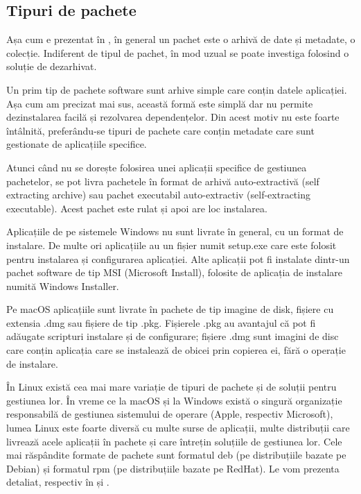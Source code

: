 \subsection{Tipuri de pachete}
\label{sec:package:types}

Așa cum e prezentat în , în general un pachet este o arhivă de date și metadate, o colecție. Indiferent de tipul de pachet, în mod uzual se poate investiga folosind o soluție de dezarhivat.

Un prim tip de pachete software sunt arhive simple care conțin datele aplicației. Așa cum am precizat mai sus, această formă este simplă dar nu permite dezinstalarea facilă și rezolvarea dependențelor. Din acest motiv nu este foarte întâlnită, preferându-se tipuri de pachete care conțin metadate care sunt gestionate de aplicațiile specifice.

Atunci când nu se dorește folosirea unei aplicații specifice de gestiunea pachetelor, se pot livra pachetele în format de arhivă auto-extractivă (self extracting archive) sau pachet executabil auto-extractiv (self-extracting executable). Acest pachet este rulat și apoi are loc instalarea.

Aplicațiile de pe sistemele Windows nu sunt livrate în general, cu un format de instalare. De multe ori aplicațiile au un fișier numit setup.exe care este folosit pentru instalarea și configurarea aplicației. Alte aplicații pot fi instalate dintr-un pachet software de tip MSI (Microsoft Install), folosite de aplicația de instalare numită Windows Installer.

Pe macOS aplicațiile sunt livrate în pachete de tip imagine de disk, fișiere cu extensia .dmg sau fișiere de tip .pkg. Fișierele .pkg au avantajul că pot fi adăugate scripturi instalare și de configurare; fișiere .dmg sunt imagini de disc care conțin aplicația care se instalează de obicei prin copierea ei, fără o operație de instalare.

În Linux există cea mai mare variație de tipuri de pachete și de soluții pentru gestiunea lor. În vreme ce la macOS și la Windows există o singură organizație responsabilă de gestiunea sistemului de operare (Apple, respectiv Microsoft), lumea Linux este foarte diversă cu multe surse de aplicații, multe distribuții care livrează acele aplicații în pachete și care întrețin soluțiile de gestiunea lor. Cele mai răspândite formate de pachete sunt formatul deb (pe distribuțiile bazate pe Debian) și formatul rpm (pe distribuțiile bazate pe RedHat). Le vom prezenta detaliat, respectiv în  și .

